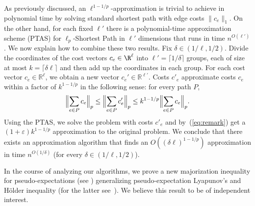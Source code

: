 \documentclass[11pt,a4paper]{article}
\begin{document}
\begin{remark} As previously discussed, an \(\ell^{1-1/p}\)-approximation is trivial to achieve in polynomial time by solving standard shortest path with edge costs \(\|c_e\|_1\). On the other hand, for each fixed \(\ell'\) there is a polynomial-time approximation scheme (PTAS) for \(\ell_p\)-Shortest Path in \(\ell'\) dimensions that runs in time \(n^{O(\ell')}\). We now explain how to combine these two results. Fix $\delta \in (1/\ell, 1/2)$. Divide the coordinates of the cost vectors \(c_e \in \R^\ell\) into \(\ell'= \lceil 1/\delta\rceil\) groups, each of size at most \(k = \lceil \delta\ell \rceil\)
and then add up the coordinates in each group. For each cost vector $c_e \in \mathbb R^\ell$, we obtain a new vector $c_e' \in \mathbb R^{\ell'}$. Costs $c'_e$ approximate costs $c_e$ within a factor of $k^{1-1/p}$ in the following sense: for every path $P$, 
\begin{equation}
    \Bigl\|\sum_{e\in P} c_e\Bigr\|_p\leq \Bigl\|\sum_{e\in P} c_e'\Bigr\|_p \leq k^{1-1/p} \Bigl\|\sum_{e\in P} c_e\Bigr\|_p .\label{eq:remark}
\end{equation}
Using the PTAS, we solve the problem with costs $c'_e$ and by~(\ref{eq:remark}) get a $(1+\varepsilon) k^{1-1/p}$ approximation to the original problem. 
We conclude that there exists an approximation algorithm that finds an $O((\delta\ell)^{1-1/p})$ approximation in time $n^{O(1/\delta)}$ (for every $\delta\in (1/\ell, 1/2)$).
\end{remark}

In the course of analyzing our algorithms, we prove a new majorization inequality for pseudo-expectations (see ) generalizing pseudo-expectation Lyapunov's  and H\"older inequality (for the latter see~\cite[arXiv version]{BKS14}). We believe this result to be of independent interest.
\end{document}
